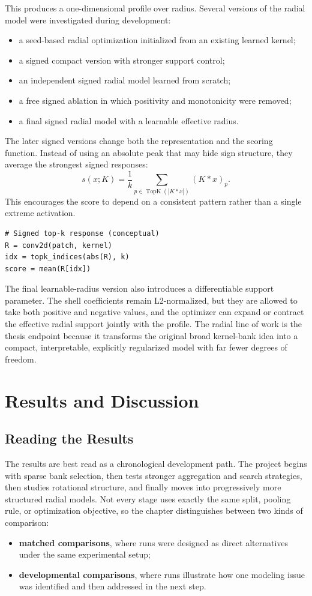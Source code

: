 \documentclass{cernatsnote}
\let\oldsection\section
\let\oldsubsection\subsection
\let\oldsubsubsection\subsubsection
\let\chapter\oldsection
\let\section\oldsubsection
\let\subsection\oldsubsubsection
\begin{document}
This produces a one-dimensional profile over radius. Several versions of the radial model were investigated during development:
\begin{itemize}
    \item a seed-based radial optimization initialized from an existing learned kernel;
    \item a signed compact version with stronger support control;
    \item an independent signed radial model learned from scratch;
    \item a free signed ablation in which positivity and monotonicity were removed;
    \item a final signed radial model with a learnable effective radius.
\end{itemize}

The later signed versions change both the representation and the scoring function. Instead of using an absolute peak that may hide sign structure, they average the strongest signed responses:
\[
s(x;K) = \frac{1}{k}\sum_{p \in \operatorname{TopK}(|K * x|)} (K * x)_p.
\]
This encourages the score to depend on a consistent pattern rather than a single extreme activation.

\begin{verbatim}
# Signed top-k response (conceptual)
R = conv2d(patch, kernel)
idx = topk_indices(abs(R), k)
score = mean(R[idx])
\end{verbatim}

The final learnable-radius version also introduces a differentiable support parameter. The shell coefficients remain L2-normalized, but they are allowed to take both positive and negative values, and the optimizer can expand or contract the effective radial support jointly with the profile. The radial line of work is the thesis endpoint because it transforms the original broad kernel-bank idea into a compact, interpretable, explicitly regularized model with far fewer degrees of freedom.

\chapter{Results and Discussion}
\section{Reading the Results}
The results are best read as a chronological development path. The project begins with sparse bank selection, then tests stronger aggregation and search strategies, then studies rotational structure, and finally moves into progressively more structured radial models. Not every stage uses exactly the same split, pooling rule, or optimization objective, so the chapter distinguishes between two kinds of comparison:
\begin{itemize}
    \item \textbf{matched comparisons}, where runs were designed as direct alternatives under the same experimental setup;
    \item \textbf{developmental comparisons}, where runs illustrate how one modeling issue was identified and then addressed in the next step.
\end{itemize}
\end{document}
